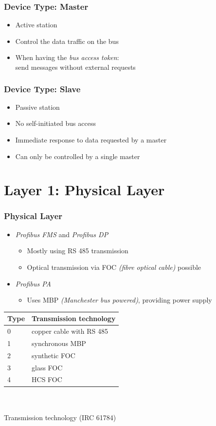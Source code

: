 \documentclass{beamer}
\begin{document}
\begin{frame}
  \frametitle{Device Type: Master}
  \begin{itemize}
    \item Active station
    \item Control the data traffic on the bus
    \item When having the \textit{bus access token}: \\
      send messages without external requests
  \end{itemize}
\end{frame}

\begin{frame}
  \frametitle{Device Type: Slave}
  \begin{itemize}
    \item Passive station
    \item No self-initiated bus access
    \item Immediate response to data requested by a master
    \item Can only be controlled by a single master
  \end{itemize}
\end{frame}

\section{Layer 1: Physical Layer}
\begin{frame}
  \frametitle{Physical Layer}
  \begin{itemize}
    \item \textit{Profibus FMS} and \textit{Profibus DP}
      \begin{itemize}
        \item Mostly using RS 485 transmission
        \item Optical transmission via FOC \textit{(fibre optical cable)} possible
      \end{itemize}
    \item \textit{Profibus PA}
      \begin{itemize}
        \item Uses MBP \textit{(Manchester bus powered)}, providing power supply
      \end{itemize}
  \end{itemize}
  \center
  \footnotesize
  \begin{tabular}[h]{l|l}
    \textbf{Type} & \textbf{Transmission technology} \\
    \hline
    0             & copper cable with RS 485 \\
    1             & synchronous MBP \\
    2             & synthetic FOC \\
    3             & glass FOC \\
    4             & HCS FOC
  \end{tabular} \\
  \hfill \\
  \normalsize
  Transmission technology (IRC 61784)~\cite{profibusmanual}
\end{frame}
\end{document}
